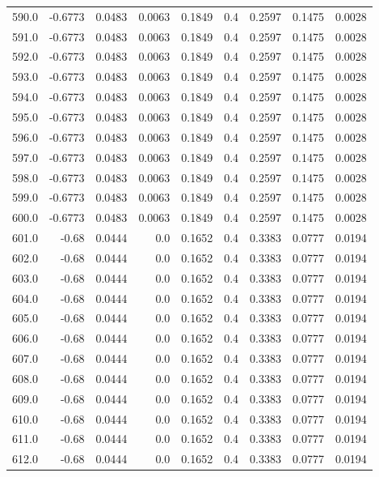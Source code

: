 \begin{longtable}{lrrrrrrrr}
590.0 & -0.6773 & 0.0483 & 0.0063 & 0.1849 & 0.4 & 0.2597 & 0.1475 & 0.0028 \\
591.0 & -0.6773 & 0.0483 & 0.0063 & 0.1849 & 0.4 & 0.2597 & 0.1475 & 0.0028 \\
592.0 & -0.6773 & 0.0483 & 0.0063 & 0.1849 & 0.4 & 0.2597 & 0.1475 & 0.0028 \\
593.0 & -0.6773 & 0.0483 & 0.0063 & 0.1849 & 0.4 & 0.2597 & 0.1475 & 0.0028 \\
594.0 & -0.6773 & 0.0483 & 0.0063 & 0.1849 & 0.4 & 0.2597 & 0.1475 & 0.0028 \\
595.0 & -0.6773 & 0.0483 & 0.0063 & 0.1849 & 0.4 & 0.2597 & 0.1475 & 0.0028 \\
596.0 & -0.6773 & 0.0483 & 0.0063 & 0.1849 & 0.4 & 0.2597 & 0.1475 & 0.0028 \\
597.0 & -0.6773 & 0.0483 & 0.0063 & 0.1849 & 0.4 & 0.2597 & 0.1475 & 0.0028 \\
598.0 & -0.6773 & 0.0483 & 0.0063 & 0.1849 & 0.4 & 0.2597 & 0.1475 & 0.0028 \\
599.0 & -0.6773 & 0.0483 & 0.0063 & 0.1849 & 0.4 & 0.2597 & 0.1475 & 0.0028 \\
600.0 & -0.6773 & 0.0483 & 0.0063 & 0.1849 & 0.4 & 0.2597 & 0.1475 & 0.0028 \\
601.0 & -0.68 & 0.0444 & 0.0 & 0.1652 & 0.4 & 0.3383 & 0.0777 & 0.0194 \\
602.0 & -0.68 & 0.0444 & 0.0 & 0.1652 & 0.4 & 0.3383 & 0.0777 & 0.0194 \\
603.0 & -0.68 & 0.0444 & 0.0 & 0.1652 & 0.4 & 0.3383 & 0.0777 & 0.0194 \\
604.0 & -0.68 & 0.0444 & 0.0 & 0.1652 & 0.4 & 0.3383 & 0.0777 & 0.0194 \\
605.0 & -0.68 & 0.0444 & 0.0 & 0.1652 & 0.4 & 0.3383 & 0.0777 & 0.0194 \\
606.0 & -0.68 & 0.0444 & 0.0 & 0.1652 & 0.4 & 0.3383 & 0.0777 & 0.0194 \\
607.0 & -0.68 & 0.0444 & 0.0 & 0.1652 & 0.4 & 0.3383 & 0.0777 & 0.0194 \\
608.0 & -0.68 & 0.0444 & 0.0 & 0.1652 & 0.4 & 0.3383 & 0.0777 & 0.0194 \\
609.0 & -0.68 & 0.0444 & 0.0 & 0.1652 & 0.4 & 0.3383 & 0.0777 & 0.0194 \\
610.0 & -0.68 & 0.0444 & 0.0 & 0.1652 & 0.4 & 0.3383 & 0.0777 & 0.0194 \\
611.0 & -0.68 & 0.0444 & 0.0 & 0.1652 & 0.4 & 0.3383 & 0.0777 & 0.0194 \\
612.0 & -0.68 & 0.0444 & 0.0 & 0.1652 & 0.4 & 0.3383 & 0.0777 & 0.0194 \\

\end{longtable}
